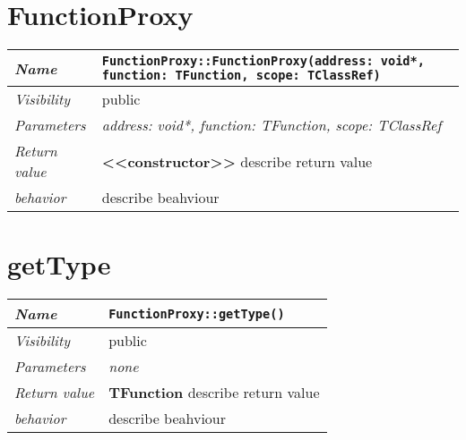\section{FunctionProxy}
\begin{longtable}{p{3cm} @{\hskip 1cm} p{12cm}}
	\hline

	\textit{Name} & \texttt{FunctionProxy::FunctionProxy(address: void*, function: TFunction, scope: TClassRef)}\\
	\hline

	\textit{Visibility} & public\\
	\hline

	\textit{Parameters} & \textit{address: void*, function: TFunction, scope: TClassRef}\\
	\hline

	\textit{Return value} & \textbf{ <<constructor>>} describe return value\\
	\hline

	\textit{behavior} & describe beahviour \\
	\hline

\end{longtable} \pagebreak

\section{getType}
\begin{longtable}{p{3cm} @{\hskip 1cm} p{12cm}}
	\hline

	\textit{Name} & \texttt{FunctionProxy::getType()}\\
	\hline

	\textit{Visibility} & public\\
	\hline

	\textit{Parameters} & \textit{none}\\
	\hline

	\textit{Return value} & \textbf{ TFunction} describe return value\\
	\hline

	\textit{behavior} & describe beahviour \\
	\hline

\end{longtable} \pagebreak

